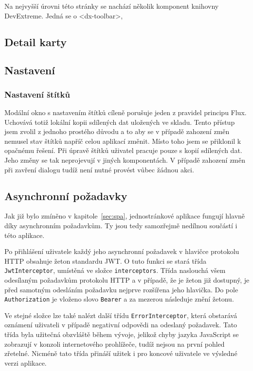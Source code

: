 Na nejvyšší úrovni této stránky se nachází několik komponent knihovny DevExtreme. Jedná se o <dx-toolbar>, %



\subsection{Detail karty}
\blindtext


\subsection{Nastavení}
\blindtext


\subsubsection{Nastavení štítků}
Modální okno s nastavením štítků cíleně porušuje jeden z pravidel principu Flux. Uchovává totiž lokální kopii sdílených dat uložených ve skladu. Tento přístup jsem zvolil z jednoho prostého důvodu a to aby se v případě zahození změn nemusel stav štítků napříč celou aplikací změnit. Místo toho jsem se přiklonil k opačnému řešení. Při úpravě štítků uživatel pracuje pouze s kopií sdílených dat. Jeho změny se tak neprojevují v jiných komponentách. V případě zahození změn při zavření dialogu tudíž není nutné provést vůbec žádnou akci. 


\subsection{Asynchronní požadavky}
Jak již bylo zmíněno v kapitole~\ref{sec:spa}, jednostránkové aplikace fungují hlavně díky asynchronním požadavkům. Ty jsou tedy samozřejmě nedílnou součástí i této aplikace.

Po přihlášení uživatele každý jeho asynchronní požadavek v hlavičce protokolu HTTP obsahuje žeton standardu JWT. O tuto funkci se stará třída \texttt{JwtInterceptor}, umístěná ve složce \texttt{interceptors}. Třída naslouchá všem odesílaným požadavkům protokolu HTTP a v případě, že je žeton již dostupný, je před samotným odesláním požadavku nejprve rozšířena jeho hlavička. Do pole \texttt{Authorization} je vloženo slovo \texttt{Bearer} a za mezerou následuje znění žetonu.

Ve stejné složce lze také nalézt další třídu \texttt{ErrorInterceptor}, která obstarává oznámení uživateli v případě negativní odpovědi na odeslaný požadavek. Tato třída byla užitečná obzvláště během vývoje, jelikož chyby jazyka JavaScript se zobrazují v konzoli internetového prohlížeče, tudíž nejsou na první pohled zřetelné. Nicméně tato třída přináší užitek i pro koncové uživatele ve výsledné verzi aplikace.

